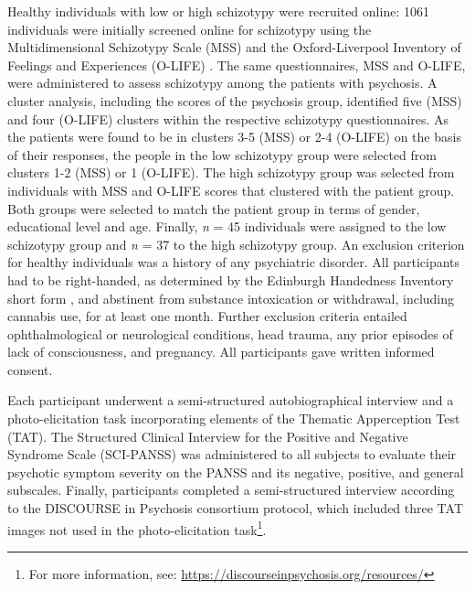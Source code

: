 \documentclass[9pt,a4paper]{rho-class/rho}
\begin{document}
Healthy individuals with low or high schizotypy were recruited online: 1061 individuals were initially screened online for schizotypy using the Multidimensional Schizotypy Scale (MSS) \cite{mason1995new, mason2006oxford} and the Oxford-Liverpool Inventory of Feelings and Experiences (O-LIFE) \cite{kwapil2018development}. The same questionnaires, MSS and O-LIFE, were administered to assess schizotypy among the patients with psychosis. A cluster analysis, including the scores of the psychosis group, identified five (MSS) and four (O-LIFE) clusters within the respective schizotypy questionnaires. As the patients were found to be in clusters 3-5 (MSS) or 2-4 (O-LIFE) on the basis of their responses, the people in the low schizotypy group were selected from clusters 1-2 (MSS) or 1 (O-LIFE). The high schizotypy group was selected from individuals with MSS and O-LIFE scores that clustered with the patient group. Both groups were selected to match the patient group in terms of gender, educational level and age. Finally, \textit{n} = 45 individuals were assigned to the low schizotypy group and \textit{n} = 37 to the high schizotypy group. An exclusion criterion for healthy individuals was a history of any psychiatric disorder. All participants had to be right-handed, as determined by the Edinburgh Handedness Inventory short form \cite{veale2014edinburgh}, and abstinent from substance intoxication or withdrawal, including cannabis use, for at least one month. Further exclusion criteria entailed ophthalmological or neurological conditions, head trauma, any prior episodes of lack of consciousness, and pregnancy. All participants gave written informed consent.

Each participant underwent a semi-structured autobiographical interview and a photo-elicitation task incorporating elements of the Thematic Apperception Test (TAT). The Structured Clinical Interview for the Positive and Negative Syndrome Scale (SCI-PANSS) was administered to all subjects to evaluate their psychotic symptom severity on the PANSS \cite{kay1987positive} and its negative, positive, and general subscales. Finally, participants completed a semi-structured interview according to the DISCOURSE in Psychosis consortium protocol, which included three TAT images not used in the photo-elicitation task\footnote{For more information, see: \url{https://discourseinpsychosis.org/resources/}}.
\end{document}
